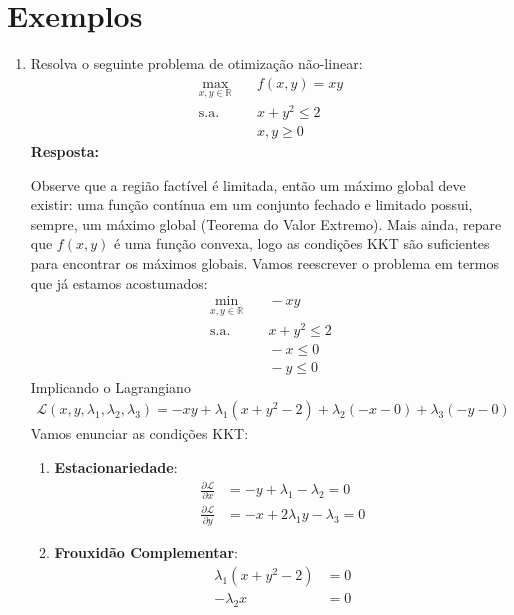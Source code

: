 \section{Exemplos}
\begin{enumerate}
    \item[1)] Resolva o seguinte problema de otimização não-linear:
        \begin{align*}
            \max_{x,y\in\mathbb{R}}&\quad f(x,y)=xy \\
            \text{s.a.}&\quad x+y^2\le 2\\
            &\quad x,y\geq0
        \end{align*}
        \textbf{Resposta:}
        \textcolor{magentao}{
        Observe que a região factível é limitada, então um máximo global deve existir: uma função contínua em um conjunto fechado e limitado possui, sempre, um máximo global (Teorema do Valor Extremo). Mais ainda, repare que $f(x,y)$ é uma função convexa, logo as condições KKT são suficientes para encontrar os máximos globais. Vamos reescrever o problema em termos que já estamos acostumados:
        \begin{align*}
            \min_{x,y\in\mathbb{R}}&\quad -xy \\
            \text{s.a.}&\quad x+y^2\le 2\\
            &\quad -x\le0\\
            &\quad -y\le0
        \end{align*}
        Implicando o Lagrangiano
        \begin{align*}
            \mathcal{L}(x,y,\lambda_1,\lambda_2,\lambda_3) = -xy + \lambda_1 (x+y^2-2) + \lambda_2(-x-0) + \lambda_3(-y-0)
        \end{align*}
        Vamos enunciar as condições KKT:
        \begin{enumerate}
            \item \textbf{Estacionariedade}:
            \begin{align*}
                \frac{\partial\mathcal{L}}{\partial x} &= -y+\lambda_1-\lambda_2 = 0\\
                \frac{\partial\mathcal{L}}{\partial y} &= -x +2\lambda_1y - \lambda_3 = 0
            \end{align*}
            \item \textbf{Frouxidão Complementar}: 
            \begin{align*}
                 \lambda_1 (x+y^2-2) &= 0 \\
                 -\lambda_2x &= 0 \\

\end{align*}
\end{enumerate}}
\end{enumerate}

